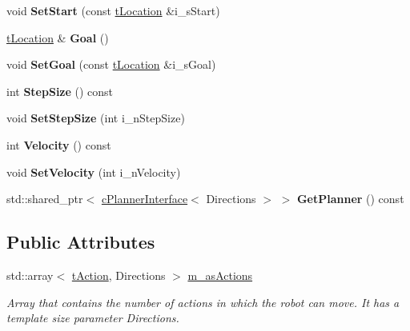 \begin{DoxyCompactItemize}
void {\bfseries Set\+Start} (const \mbox{\hyperlink{structplanner_1_1t_location}{t\+Location}} \&i\+\_\+s\+Start)
\item 
\mbox{\label{classplanner_1_1c_rover_interface_a5a02ffb5e04d128bf81567da55807850}} 
\mbox{\hyperlink{structplanner_1_1t_location}{t\+Location}} \& {\bfseries Goal} ()
\item 
\mbox{\label{classplanner_1_1c_rover_interface_a8f0e30cf351e8cb7ba75622273056343}} 
void {\bfseries Set\+Goal} (const \mbox{\hyperlink{structplanner_1_1t_location}{t\+Location}} \&i\+\_\+s\+Goal)
\item 
\mbox{\label{classplanner_1_1c_rover_interface_a2a10c0d42c89adefa46390fe351583a2}} 
int {\bfseries Step\+Size} () const
\item 
\mbox{\label{classplanner_1_1c_rover_interface_ac6410b636f0f2d5614e3463912f9646f}} 
void {\bfseries Set\+Step\+Size} (int i\+\_\+n\+Step\+Size)
\item 
\mbox{\label{classplanner_1_1c_rover_interface_a65279be04ab88f54d69204087503448b}} 
int {\bfseries Velocity} () const
\item 
\mbox{\label{classplanner_1_1c_rover_interface_a209a069d48223e427e27e4582037b158}} 
void {\bfseries Set\+Velocity} (int i\+\_\+n\+Velocity)
\item 
\mbox{\label{classplanner_1_1c_rover_interface_aeab2cd88b65b86f42cfbb5b063d3f9d1}} 
std\+::shared\+\_\+ptr$<$ \mbox{\hyperlink{classplanner_1_1c_planner_interface}{c\+Planner\+Interface}}$<$ Directions $>$ $>$ {\bfseries Get\+Planner} () const
\end{DoxyCompactItemize}
\subsection*{Public Attributes}
\begin{DoxyCompactItemize}
\item 
\mbox{\label{classplanner_1_1c_rover_interface_a119c31cfd1e6aa72921fc5185e6f44a5}} 
std\+::array$<$ \mbox{\hyperlink{structplanner_1_1t_action}{t\+Action}}, Directions $>$ \mbox{\hyperlink{classplanner_1_1c_rover_interface_a119c31cfd1e6aa72921fc5185e6f44a5}{m\+\_\+as\+Actions}}
\begin{DoxyCompactList}\small\item\em Array that contains the number of actions in which the robot can move. It has a template size parameter Directions. \end{DoxyCompactList}\end{DoxyCompactItemize}
